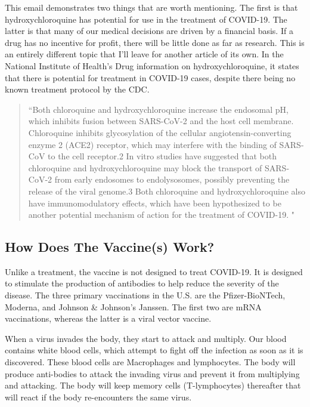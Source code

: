 \documentclass[10pt, a4paper, twocolumn]{book}
\begin{document}
This email demonstrates two things that are worth mentioning. The first is that hydroxychloroquine has potential for use in the treatment of COVID-19. The latter is that many of our medical decisions are driven by a financial basis. If a drug has no incentive for profit, there will be little done as far as research. This is an entirely different topic that I'll leave for another article of its own. In the National Institute of Health's Drug information on hydroxychloroquine, it states that there is potential for treatment in COVID-19 cases, despite there being no known treatment protocol by the CDC.

\begin{quotation}
	``Both chloroquine and hydroxychloroquine increase the endosomal pH, which inhibits fusion between SARS-CoV-2 and the host cell membrane. Chloroquine inhibits glycosylation of the cellular angiotensin-converting enzyme 2 (ACE2) receptor, which may interfere with the binding of SARS-CoV to the cell receptor.2 In vitro studies have suggested that both chloroquine and hydroxychloroquine may block the transport of SARS-CoV-2 from early endosomes to endolysosomes, possibly preventing the release of the viral genome.3 Both chloroquine and hydroxychloroquine also have immunomodulatory effects, which have been hypothesized to be another potential mechanism of action for the treatment of COVID-19. \citep{NIHHydroxychloroquine}"
\end{quotation}









\subsection{How Does The Vaccine(s) Work?}

Unlike a treatment, the vaccine is not designed to treat COVID-19. It is designed to stimulate the production of antibodies to help reduce the severity of the disease. The three primary vaccinations in the U.S. are the Pfizer-BioNTech, Moderna, and Johnson \& Johnson’s Janssen. The first two are mRNA vaccinations, whereas the latter is a viral vector vaccine.

When a virus invades the body, they start to attack and multiply. Our blood contains white blood cells, which attempt to fight off the infection as soon as it is discovered. These blood cells are Macrophages and lymphocytes. The body will produce anti-bodies to attack the invading virus and prevent it from multiplying and attacking. The body will keep memory cells (T-lymphocytes) thereafter that will react if the body re-encounters the same virus. 
\end{document}
